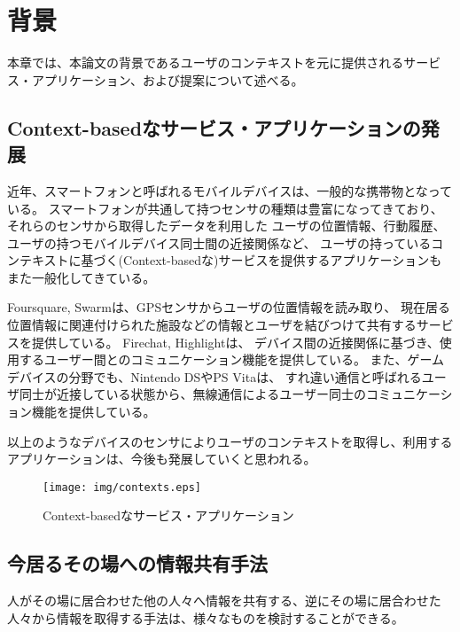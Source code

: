 \chapter{背景}\label{chap:background}

本章では、本論文の背景であるユーザのコンテキストを元に提供されるサービス・アプリケーション、および提案について述べる。

\newpage


\section{Context-basedなサービス・アプリケーションの発展}

近年、スマートフォンと呼ばれるモバイルデバイスは、一般的な携帯物となっている。
スマートフォンが共通して持つセンサの種類は豊富になってきており、それらのセンサから取得したデータを利用した
ユーザの位置情報、行動履歴、ユーザの持つモバイルデバイス同士間の近接関係など、
ユーザの持っているコンテキストに基づく(Context-basedな)サービスを提供するアプリケーションもまた一般化してきている。

Foursquare\cite{foursquare}, Swarm\cite{swarm}は、GPSセンサからユーザの位置情報を読み取り、
現在居る位置情報に関連付けられた施設などの情報とユーザを結びつけて共有するサービスを提供している。
Firechat\cite{firechat}, Highlight\cite{highlight}は、
デバイス間の近接関係に基づき、使用するユーザー間とのコミュニケーション機能を提供している。
また、ゲームデバイスの分野でも、Nintendo DS\cite{3ds}やPS Vita\cite{vita}は、
すれ違い通信と呼ばれるユーザ同士が近接している状態から、無線通信によるユーザー同士のコミュニケーション機能を提供している。

以上のようなデバイスのセンサによりユーザのコンテキストを取得し、利用するアプリケーションは、今後も発展していくと思われる。

\begin{figure}[h]
    \begin{center}
        \texttt{[image: img/contexts.eps]}
    \end{center}
    \caption{Context-basedなサービス・アプリケーション}
    \label{fig:contexts}
\end{figure}


\section{今居るその場への情報共有手法}

人がその場に居合わせた他の人々へ情報を共有する、逆にその場に居合わせた人々から情報を取得する手法は、様々なものを検討することができる。

